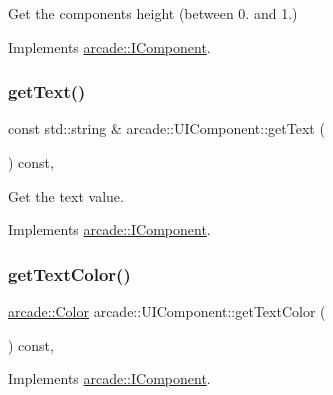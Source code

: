 Get the component\textquotesingle{}s height (between 0. and 1.) 



Implements \hyperlink{classarcade_1_1_i_component_a77a3bed39227f11d06bb71e06ee2ee30}{arcade\+::\+I\+Component}.

\mbox{\label{classarcade_1_1_u_i_component_aa930897f9456ed9462063481d19d10ed}} 
\subsubsection{\texorpdfstring{get\+Text()}{getText()}}
{\footnotesize\ttfamily const std\+::string \& arcade\+::\+U\+I\+Component\+::get\+Text (\begin{DoxyParamCaption}{ }\end{DoxyParamCaption}) const\hspace{0.3cm}{\ttfamily [override]}, {\ttfamily [virtual]}}



Get the text value. 



Implements \hyperlink{classarcade_1_1_i_component_a7c09ef60e3d41d4afedf2be77fe880a7}{arcade\+::\+I\+Component}.

\mbox{\label{classarcade_1_1_u_i_component_a0a9e2a34357ad6759d580e152a20adee}} 
\subsubsection{\texorpdfstring{get\+Text\+Color()}{getTextColor()}}
{\footnotesize\ttfamily \hyperlink{unionarcade_1_1_color}{arcade\+::\+Color} arcade\+::\+U\+I\+Component\+::get\+Text\+Color (\begin{DoxyParamCaption}{ }\end{DoxyParamCaption}) const\hspace{0.3cm}{\ttfamily [override]}, {\ttfamily [virtual]}}



Implements \hyperlink{classarcade_1_1_i_component_a9d4c57ad7c49e39ef0269f10fdc14807}{arcade\+::\+I\+Component}.

